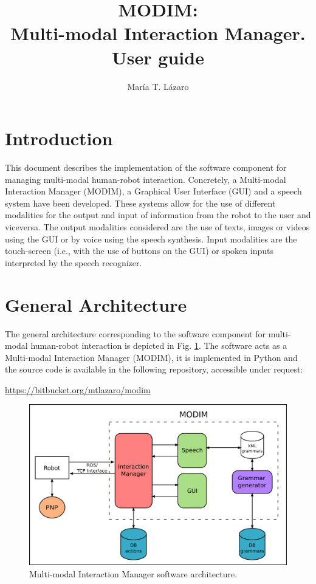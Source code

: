 \documentclass[11pt,a4paper]{article}
\begin{document}
\title{{\bf MODIM: \\Multi-modal Interaction Manager.}\\ User guide}
\author{Mar\'ia T. L\'azaro}
\maketitle

\newpage
\section{Introduction}
This document describes the implementation of the software component for managing multi-modal human-robot interaction. 
Concretely, a Multi-modal Interaction Manager (MODIM), a Graphical User Interface (GUI) and a speech system have been developed. These systems allow for the use of different modalities for the output and input of information from the robot to the user and viceversa. The output modalities considered are the use of texts, images or videos using the GUI or by voice using the speech synthesis. Input modalities are the touch-screen (i.e., with the use of buttons on the GUI) or spoken inputs interpreted by the speech recognizer.

\section{General Architecture}
The general architecture corresponding to the software component for multi-modal human-robot interaction is depicted in Fig. \ref{fig:architecture}. The software acts as a Multi-modal Interaction Manager (MODIM), it is implemented in Python and the source code is available in the following repository, accessible under request:
\begin{center}
  \url{https://bitbucket.org/mtlazaro/modim}
\end{center}

\begin{figure}[!t]
\centering
\includegraphics[width=.6\columnwidth]{img/modim.png}
\caption{Multi-modal Interaction Manager software architecture.}
\label{fig:architecture}
\end{figure}
\end{document}
